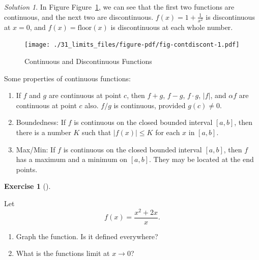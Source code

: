 \documentclass[
  letterpaper,
]{book}
\providecommand{\tightlist}{%
  \setlength{\itemsep}{0pt}\setlength{\parskip}{0pt}}\usepackage{longtable,booktabs,array}
\theoremstyle{definition}
\theoremstyle{definition}
\theoremstyle{plain}
\theoremstyle{definition}
\newtheorem{exercise}{Exercise}[chapter]
\theoremstyle{plain}
\theoremstyle{plain}
\theoremstyle{remark}
\newtheorem*{solution}{Solution}
\begin{document}
\begin{solution}

In Figure Figure~\ref{fig-contdiscont}, we can see that the first two
functions are continuous, and the next two are discontinuous.
\(f(x) = 1 + \frac{1}{x^2}\) is discontinuous at \(x= 0\), and
\(f(x) = \text{floor}(x)\) is discontinuous at each whole number.

\end{solution}

\begin{figure}

{\centering \texttt{[image: ./31\_limits\_files/figure-pdf/fig-contdiscont-1.pdf]}

}

\caption{\label{fig-contdiscont}Continuous and Discontinuous Functions}

\end{figure}

Some properties of continuous functions:

\hypertarget{prop-conti}{}
\begin{enumerate}
\def\labelenumi{\arabic{enumi}.}
\tightlist
\item
  If \(f\) and \(g\) are continuous at point \(c\), then \(f+g\),
  \(f-g\), \(f \cdot g\), \(|f|\), and \(\alpha f\) are continuous at
  point \(c\) also. \(f/g\) is continuous, provided \(g(c)\ne 0\).
\item
  Boundedness: If \(f\) is continuous on the closed bounded interval
  \([a,b]\), then there is a number \(K\) such that \(|f(x)|\le K\) for
  each \(x\) in \([a,b]\).
\item
  Max/Min: If \(f\) is continuous on the closed bounded interval
  \([a,b]\), then \(f\) has a maximum and a minimum on \([a,b]\). They
  may be located at the end points.
\end{enumerate}

\leavevmode{}%
\begin{exercise}[]\label{exr-discontdraw}

Let \[f(x) = \frac{x^2 + 2x}{x}.\]

\begin{enumerate}
\def\labelenumi{\arabic{enumi}.}
\tightlist
\item
  Graph the function. Is it defined everywhere?
\item
  What is the functions limit at \(x \rightarrow 0\)?
\end{enumerate}

\end{exercise}
\end{document}
